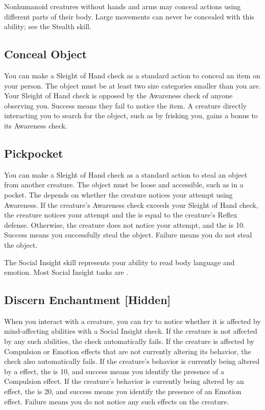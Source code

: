         Nonhumanoid creatures without hands and arms may conceal actions using different parts of their body. Large movements can never be concealed with this ability; see the Stealth skill.

    \subsection{Conceal Object}
        You can make a Sleight of Hand check as a standard action to conceal an item on your person. The object must be at least two size categories smaller than you are. Your Sleight of Hand check is opposed by the Awareness check of anyone observing you. Success means they fail to notice the item. A creature directly interacting you to search for the object, such as by frisking you, gains a  bonus to its Awareness check.

    \subsection{Pickpocket}
        You can make a Sleight of Hand check as a standard action to steal an object from another creature. The object must be loose and accessible, such as in a pocket. The  depends on whether the creature notices your attempt using Awareness. If the creature's Awareness check exceeds your Sleight of Hand check, the creature notices your attempt and the  is equal to the creature's Reflex defense. Otherwise, the creature does not notice your attempt, and the  is 10. Success means you successfully steal the object. Failure means you do not steal the object.

\newpage
{}
        The Social Insight skill represents your ability to read body language and emotion.
        Most Social Insight tasks are .

    \subsection{Discern Enchantment [Hidden]}
        When you interact with a creature, you can try to notice whether it is affected by mind-affecting abilities with a Social Insight check.
        If the creature is not affected by any such abilities, the check automatically fails.
        If the creature is affected by Compulsion or Emotion effects that are not currently altering its behavior, the check also automatically fails.
        If the creature's behavior is currently being altered by a  effect, the  is 10, and success means you identify the presence of a Compulsion effect.
        If the creature's behavior is currently being altered by an  effect, the  is 20, and success means you identify the presence of an Emotion effect.
        Failure means you do not notice any such effects on the creature.

